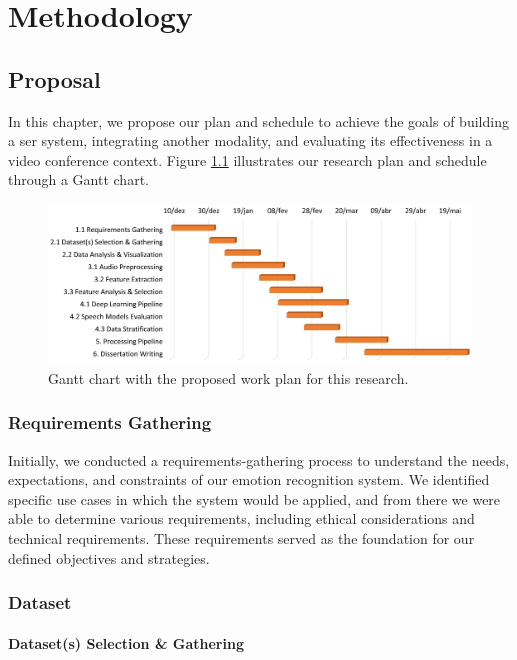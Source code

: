 \chapter{Methodology}
\label{chapter:prop}

\section{Proposal}

In this chapter, we propose our plan and schedule to achieve the goals of building a \ac{ser} system, integrating another modality, and evaluating its effectiveness in a video conference context. Figure \ref{fig:gantt} illustrates our research plan and schedule through a Gantt chart.

\begin{figure}[h]
  \centering
  \includegraphics[width=\linewidth]{figs/3_methodology/gantt_chart.png}
  \caption{Gantt chart with the proposed work plan for this research.}
  \label{fig:gantt}
\end{figure}

\subsection{Requirements Gathering}

Initially, we conducted a requirements-gathering process to understand the needs, expectations, and constraints of our emotion recognition system. We identified specific use cases in which the system would be applied, and from there we were able to determine various requirements, including ethical considerations and technical requirements. These requirements served as the foundation for our defined objectives and strategies.


\subsection{Dataset}

\subsubsection{Dataset(s) Selection \& Gathering}

